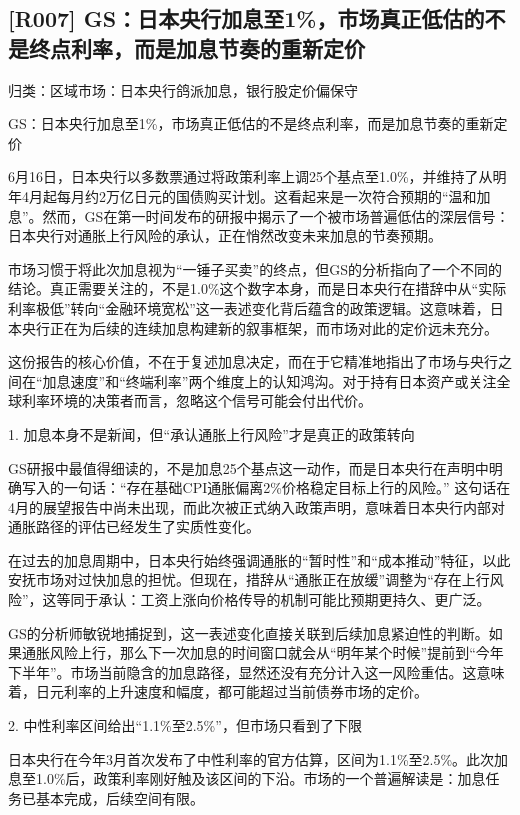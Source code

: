 \documentclass[11pt]{ctexart}
\begin{document}
\subsection{[R007] GS：日本央行加息至1\%，市场真正低估的不是终点利率，而是加息节奏的重新定价}
{\small\color{refgray}归类：区域市场：日本央行鸽派加息，银行股定价偏保守}

GS：日本央行加息至1\%，市场真正低估的不是终点利率，而是加息节奏的重新定价

6月16日，日本央行以多数票通过将政策利率上调25个基点至1.0\%，并维持了从明年4月起每月约2万亿日元的国债购买计划。这看起来是一次符合预期的“温和加息”。然而，GS在第一时间发布的研报中揭示了一个被市场普遍低估的深层信号：日本央行对通胀上行风险的承认，正在悄然改变未来加息的节奏预期。

市场习惯于将此次加息视为“一锤子买卖”的终点，但GS的分析指向了一个不同的结论。真正需要关注的，不是1.0\%这个数字本身，而是日本央行在措辞中从“实际利率极低”转向“金融环境宽松”这一表述变化背后蕴含的政策逻辑。这意味着，日本央行正在为后续的连续加息构建新的叙事框架，而市场对此的定价远未充分。

这份报告的核心价值，不在于复述加息决定，而在于它精准地指出了市场与央行之间在“加息速度”和“终端利率”两个维度上的认知鸿沟。对于持有日本资产或关注全球利率环境的决策者而言，忽略这个信号可能会付出代价。

1. 加息本身不是新闻，但“承认通胀上行风险”才是真正的政策转向

GS研报中最值得细读的，不是加息25个基点这一动作，而是日本央行在声明中明确写入的一句话：“存在基础CPI通胀偏离2\%价格稳定目标上行的风险。” 这句话在4月的展望报告中尚未出现，而此次被正式纳入政策声明，意味着日本央行内部对通胀路径的评估已经发生了实质性变化。

在过去的加息周期中，日本央行始终强调通胀的“暂时性”和“成本推动”特征，以此安抚市场对过快加息的担忧。但现在，措辞从“通胀正在放缓”调整为“存在上行风险”，这等同于承认：工资上涨向价格传导的机制可能比预期更持久、更广泛。

GS的分析师敏锐地捕捉到，这一表述变化直接关联到后续加息紧迫性的判断。如果通胀风险上行，那么下一次加息的时间窗口就会从“明年某个时候”提前到“今年下半年”。市场当前隐含的加息路径，显然还没有充分计入这一风险重估。这意味着，日元利率的上升速度和幅度，都可能超过当前债券市场的定价。

2. 中性利率区间给出“1.1\%至2.5\%”，但市场只看到了下限

日本央行在今年3月首次发布了中性利率的官方估算，区间为1.1\%至2.5\%。此次加息至1.0\%后，政策利率刚好触及该区间的下沿。市场的一个普遍解读是：加息任务已基本完成，后续空间有限。
\end{document}
